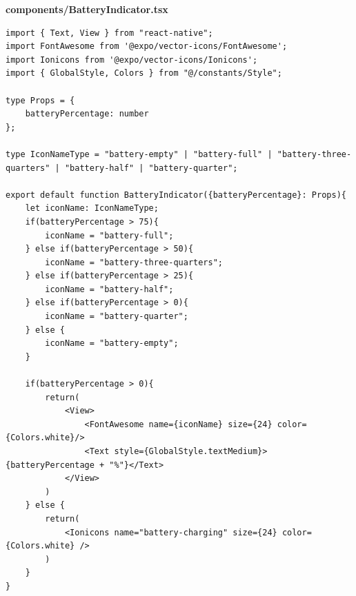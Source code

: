 \documentclass[11pt, twoside]{article}
\begin{document}
\textbf{components/BatteryIndicator.tsx}
\begin{lstlisting}
import { Text, View } from "react-native";
import FontAwesome from '@expo/vector-icons/FontAwesome';
import Ionicons from '@expo/vector-icons/Ionicons';
import { GlobalStyle, Colors } from "@/constants/Style";

type Props = {
    batteryPercentage: number
};

type IconNameType = "battery-empty" | "battery-full" | "battery-three-quarters" | "battery-half" | "battery-quarter";

export default function BatteryIndicator({batteryPercentage}: Props){
    let iconName: IconNameType;
    if(batteryPercentage > 75){
        iconName = "battery-full";
    } else if(batteryPercentage > 50){
        iconName = "battery-three-quarters";
    } else if(batteryPercentage > 25){
        iconName = "battery-half";
    } else if(batteryPercentage > 0){
        iconName = "battery-quarter";
    } else {
        iconName = "battery-empty";
    }

    if(batteryPercentage > 0){
        return(
            <View>
                <FontAwesome name={iconName} size={24} color={Colors.white}/>
                <Text style={GlobalStyle.textMedium}>{batteryPercentage + "%"}</Text>
            </View>
        )
    } else {
        return(
            <Ionicons name="battery-charging" size={24} color={Colors.white} />
        )
    }
}
\end{lstlisting}
\end{document}
